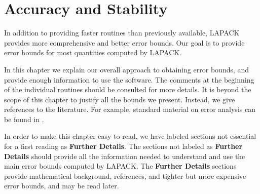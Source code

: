 \chapter{Accuracy and Stability}\label{chapaccstab}

\newcommand{\calS}{{\cal S}}
\newcommand{\hatcalS}{{\hat{\cal S}}}
\newcommand{\shat}{\hat{s}}
\newcommand{\Shat}{\hat{S}}
\newcommand{\xhat}{\hat{x}}
\newcommand{\alg}{{\rm alg}}
\def\stacksymbols #1#2#3#4{\def\theguybelow{#2}
    \def\verticalposition{\lower#3pt}
    \def\spacingwithinsymbol{\baselineskip0pt\lineskip#4pt}
    \mathrel{\mathpalette\intermediary#1}}
\def\intermediary#1#2{\verticalposition\vbox{\spacingwithinsymbol
      \everycr={}\tabskip0pt
      \halign{$\mathsurround0pt#1\hfil##\hfil$\crcr#2\crcr
               \theguybelow\crcr}}}
\def\leapproxeq{\mathrel{\raisebox{-.75ex}{$\mathop{\sim}\limits^{\textstyle <}$}}}
\def\geapproxeq{\mathrel{\raisebox{-.75ex}{$\mathop{\sim}\limits^{\textstyle >}$}}}
\def\ltapprox{\stacksymbols{<}{\sim}{2.5}{.2}}
\def\gtapprox{\stacksymbols{>}{\sim}{2.5}{.2}}

\newcommand{\nrminf}[1]{ \| #1 \|_\infty }
\newcommand{\nrmtwo}[1]{ \| #1 \|_2 }
\newcommand{\nrmfro}[1]{ \| #1 \|_F }
\newcommand{\nrmone}[1]{ \| #1 \|_1 }

\newcommand{\norma}[1]{ \| #1 \| }
\newcommand{\ds}{\displaystyle}
\newcommand{\ba}{\bar}
\newcommand{\ti}{\tilde}
\newcommand{\ha}{\widehat}

In addition to providing faster routines than previously available,
LAPACK provides more comprehensive and better
error bounds.
Our goal is to provide error bounds for most quantities computed by LAPACK.

In this chapter we explain our overall approach to obtaining error bounds,
and provide enough information to use the software.
The comments at the beginning of the individual routines should be consulted
for more details.
It is beyond the scope of this chapter to justify all the bounds
we present. Instead, we give references to the literature.
For example, standard material on error analysis can be found
in \cite{demmelMA221,GVL2,higham02,stewartsun90}.

In order to make this chapter easy to read, we have labeled sections
not essential for a first reading as {\bf Further Details}. The sections
not labeled as {\bf Further Details} should provide all the information
needed to understand and use the main error bounds computed by
LAPACK.  The {\bf Further Details} sections provide mathematical background,
references, and tighter but more expensive error bounds, and may be read later.

